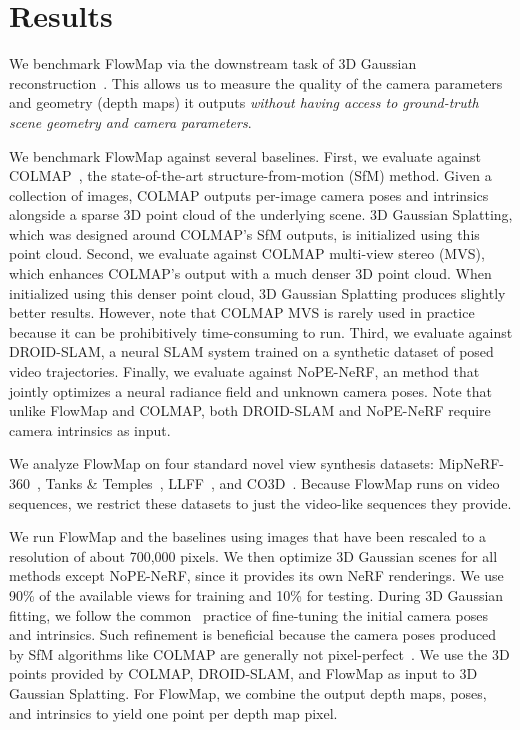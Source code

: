 



\section{Results}
\label{sec:exp}

We benchmark FlowMap via the downstream task of 3D Gaussian reconstruction~\cite{kerbl20233d}.
This allows us to measure the quality of the camera parameters and geometry (depth maps) it outputs \emph{without having access to ground-truth scene geometry and camera parameters}.


We benchmark FlowMap against several baselines.
First, we evaluate against COLMAP~\cite{schonberger2016structure}, the state-of-the-art structure-from-motion (SfM) method.
Given a collection of images, COLMAP outputs per-image camera poses and intrinsics alongside a sparse 3D point cloud of the underlying scene.
3D Gaussian Splatting, which was designed around COLMAP's SfM outputs, is initialized using this point cloud.
Second, we evaluate against COLMAP multi-view stereo (MVS), which enhances COLMAP's output with a much denser 3D point cloud.
When initialized using this denser point cloud, 3D Gaussian Splatting produces slightly better results.
However, note that COLMAP MVS is rarely used in practice because it can be prohibitively time-consuming to run.
Third, we evaluate against DROID-SLAM, a neural SLAM system trained on a synthetic dataset of posed video trajectories.
Finally, we evaluate against NoPE-NeRF, an method that jointly optimizes a neural radiance field and unknown camera poses.
Note that unlike FlowMap and COLMAP, both DROID-SLAM and NoPE-NeRF require camera intrinsics as input.


We analyze FlowMap on four standard novel view synthesis datasets: MipNeRF-360~\cite{barron2021mipnerf}, Tanks \& Temples~\cite{Knapitsch2017tanks}, LLFF~\cite{mildenhall2019local}, and CO3D~\cite{reizenstein2021common}.
Because FlowMap runs on video sequences, we restrict these datasets to just the video-like sequences they provide.


We run FlowMap and the baselines using images that have been rescaled to a resolution of about 700,000 pixels.
We then optimize 3D Gaussian scenes for all methods except NoPE-NeRF, since it provides its own NeRF renderings.
We use 90\% of the available views for training and 10\% for testing.
During 3D Gaussian fitting, we follow the common~\cite{nerfstudio} practice of fine-tuning the initial camera poses and intrinsics.
Such refinement is beneficial because the camera poses produced by SfM algorithms like COLMAP are generally not pixel-perfect~\cite{park2023camp,lin2021barf}.
We use the 3D points provided by COLMAP, DROID-SLAM, and FlowMap as input to 3D Gaussian Splatting.
For FlowMap, we combine the output depth maps, poses, and intrinsics to yield one point per depth map pixel.


